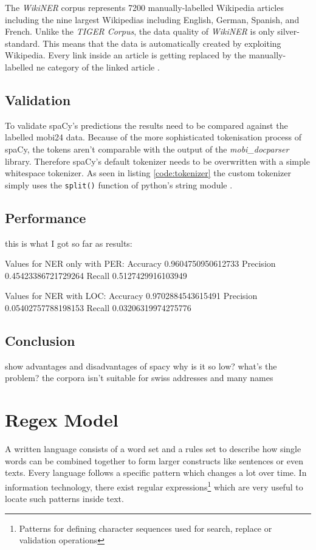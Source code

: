 The \emph{WikiNER} corpus represents 7200 manually-labelled Wikipedia articles including the nine largest Wikipedias including English, German, Spanish,
and French. Unlike the \emph{TIGER Corpus}, the data quality of \emph{WikiNER} is only silver-standard. This means that the data is automatically created
by exploiting Wikipedia. Every link inside an article is getting replaced by the manually-labelled \acrshort{ne} category of the linked article \cite{Nothman}.

\subsection{Validation}

To validate spaCy's predictions the results need to be compared against the labelled \gls{mobi24} data. Because of the more sophisticated tokenisation
process of spaCy, the tokens aren't comparable with the output of the \emph{mobi\_docparser} library. Therefore spaCy's default tokenizer needs to be
overwritten with a simple whitespace tokenizer. As seen in listing \ref{code:tokenizer} the custom tokenizer simply uses the \verb|split()| function of
python's string module \cite{spacy-tok}.

\subsection{Performance}



this is what I got so far as results:

Values for NER only with PER:
    Accuracy 0.9604750950612733
    Precision 0.45423386721729264
    Recall 0.5127429916103949
    
Values for NER with LOC:
	Accuracy 0.9702884543615491
	Precision 0.05402757788198153
	Recall 0.03206319974275776

\subsection{Conclusion}

show advantages and disadvantages of spacy
why is it so low? what's the problem? the corpora isn't suitable for swiss addresses and many names

\section{Regex Model}
\label{chap:regex-model}
A written language consists of a word set and a rules set to describe how single words can be combined together to form larger constructs
like sentences or even texts. Every language follows a specific pattern which changes a lot over time. In information technology, there exist
regular expressions\footnote{Patterns for defining character sequences used for search, replace or validation operations} which are very useful
to locate such patterns inside text.

